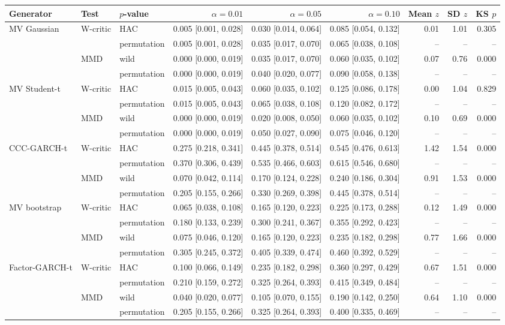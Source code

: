 \begin{tabular}{lllrrrrrr}
\toprule
Generator & Test & $p$-value & $\alpha=0.01$ & $\alpha=0.05$ & $\alpha=0.10$ & Mean $z$ & SD $z$ & KS $p$ \\
\midrule
MV Gaussian & W-critic & HAC & 0.005 [0.001, 0.028] & 0.030 [0.014, 0.064] & 0.085 [0.054, 0.132] & 0.01 & 1.01 & 0.305 \\
 &  & permutation & 0.005 [0.001, 0.028] & 0.035 [0.017, 0.070] & 0.065 [0.038, 0.108] & -- & -- & -- \\
 & MMD & wild & 0.000 [0.000, 0.019] & 0.035 [0.017, 0.070] & 0.060 [0.035, 0.102] & 0.07 & 0.76 & 0.000 \\
 &  & permutation & 0.000 [0.000, 0.019] & 0.040 [0.020, 0.077] & 0.090 [0.058, 0.138] & -- & -- & -- \\
MV Student-t & W-critic & HAC & 0.015 [0.005, 0.043] & 0.060 [0.035, 0.102] & 0.125 [0.086, 0.178] & 0.00 & 1.04 & 0.829 \\
 &  & permutation & 0.015 [0.005, 0.043] & 0.065 [0.038, 0.108] & 0.120 [0.082, 0.172] & -- & -- & -- \\
 & MMD & wild & 0.000 [0.000, 0.019] & 0.020 [0.008, 0.050] & 0.060 [0.035, 0.102] & 0.10 & 0.69 & 0.000 \\
 &  & permutation & 0.000 [0.000, 0.019] & 0.050 [0.027, 0.090] & 0.075 [0.046, 0.120] & -- & -- & -- \\
CCC-GARCH-t & W-critic & HAC & 0.275 [0.218, 0.341] & 0.445 [0.378, 0.514] & 0.545 [0.476, 0.613] & 1.42 & 1.54 & 0.000 \\
 &  & permutation & 0.370 [0.306, 0.439] & 0.535 [0.466, 0.603] & 0.615 [0.546, 0.680] & -- & -- & -- \\
 & MMD & wild & 0.070 [0.042, 0.114] & 0.170 [0.124, 0.228] & 0.240 [0.186, 0.304] & 0.91 & 1.53 & 0.000 \\
 &  & permutation & 0.205 [0.155, 0.266] & 0.330 [0.269, 0.398] & 0.445 [0.378, 0.514] & -- & -- & -- \\
MV bootstrap & W-critic & HAC & 0.065 [0.038, 0.108] & 0.165 [0.120, 0.223] & 0.225 [0.173, 0.288] & 0.12 & 1.49 & 0.000 \\
 &  & permutation & 0.180 [0.133, 0.239] & 0.300 [0.241, 0.367] & 0.355 [0.292, 0.423] & -- & -- & -- \\
 & MMD & wild & 0.075 [0.046, 0.120] & 0.165 [0.120, 0.223] & 0.235 [0.182, 0.298] & 0.77 & 1.66 & 0.000 \\
 &  & permutation & 0.305 [0.245, 0.372] & 0.405 [0.339, 0.474] & 0.460 [0.392, 0.529] & -- & -- & -- \\
Factor-GARCH-t & W-critic & HAC & 0.100 [0.066, 0.149] & 0.235 [0.182, 0.298] & 0.360 [0.297, 0.429] & 0.67 & 1.51 & 0.000 \\
 &  & permutation & 0.210 [0.159, 0.272] & 0.325 [0.264, 0.393] & 0.415 [0.349, 0.484] & -- & -- & -- \\
 & MMD & wild & 0.040 [0.020, 0.077] & 0.105 [0.070, 0.155] & 0.190 [0.142, 0.250] & 0.64 & 1.10 & 0.000 \\
 &  & permutation & 0.205 [0.155, 0.266] & 0.325 [0.264, 0.393] & 0.400 [0.335, 0.469] & -- & -- & -- \\
\bottomrule
\end{tabular}

